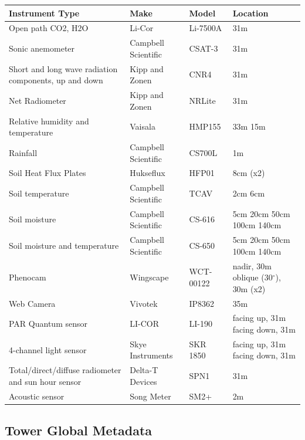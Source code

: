 \documentclass[11pt,a4paper]{article}
\begin{document}
\begin{longtable}{p{4.5cm}p{3.5cm}p{3.5cm}p{3.5cm}}
\toprule
\textbf{Instrument Type} & \textbf{Make} & \textbf{Model} & \textbf{Location} \\
\midrule
\endhead
\bottomrule
\endfoot
Open path         CO2, H2O & Li-Cor & Li-7500A & 31m \\
Sonic anemometer & Campbell Scientific & CSAT-3 & 31m \\
Short and long wave radiation components, up and down & Kipp and Zonen & CNR4 & 31m \\
Net Radiometer & Kipp and Zonen & NRLite & 31m \\
Relative humidity and temperature & Vaisala & HMP155 & 33m             15m \\
Rainfall & Campbell Scientific & CS700L & 1m \\
Soil Heat Flux Plates & Hukseflux & HFP01 & 8cm (x2) \\
Soil temperature & Campbell Scientific & TCAV & 2cm       6cm \\
Soil moisture & Campbell Scientific & CS-616 & 5cm       20cm       50cm       100cm       140cm \\
Soil moisture and temperature & Campbell Scientific & CS-650 & 5cm       20cm       50cm       100cm       140cm \\
Phenocam & Wingscape & WCT-00122 & nadir, 30m       oblique (30$^\circ$), 30m (x2) \\
Web Camera & Vivotek & IP8362 & 35m \\
PAR Quantum sensor & LI-COR & LI-190 & facing up, 31m     facing down, 31m \\
4-channel light sensor & Skye Instruments & SKR 1850 & facing up, 31m     facing down, 31m \\
Total/direct/diffuse radiometer and sun hour sensor & Delta-T Devices & SPN1 & 31m \\
Acoustic sensor & Song Meter & SM2+ & 2m \\
\end{longtable}


\subsection*{Tower Global Metadata}
\end{document}
